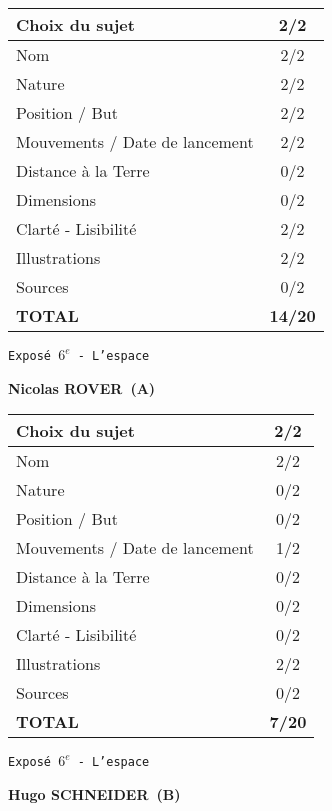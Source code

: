 	\vspace*{2cm}
	\begin{tabular}{|l|c|}
		\hline
		Choix du sujet & 2/2 \\
		\hline
		Nom & 2/2 \\
		\hline
		Nature & 2/2 \\
		\hline
		Position / But & 2/2 \\
		\hline
		Mouvements / Date de lancement & 2/2 \\
		\hline
		Distance \`a la Terre & 0/2 \\
		\hline
		Dimensions & 0/2 \\
		\hline
		Clart\'e - Lisibilit\'e & 2/2 \\
		\hline
		Illustrations & 2/2 \\
		\hline
		Sources & 0/2 \\
		\hline
		\textbf{TOTAL}  & \textbf{14/20} \\
		\hline
	\end{tabular}
	\newline
	\LARGE{\texttt{Expos\'e $6^e$ - L'espace}}
	\vspace*{1cm}

	\textbf{Nicolas ROVER\ (A)}

	\vspace*{2cm}
	\begin{tabular}{|l|c|}
		\hline
		Choix du sujet & 2/2 \\
		\hline
		Nom & 2/2 \\
		\hline
		Nature & 0/2 \\
		\hline
		Position / But & 0/2 \\
		\hline
		Mouvements / Date de lancement & 1/2 \\
		\hline
		Distance \`a la Terre & 0/2 \\
		\hline
		Dimensions & 0/2 \\
		\hline
		Clart\'e - Lisibilit\'e & 0/2 \\
		\hline
		Illustrations & 2/2 \\
		\hline
		Sources & 0/2 \\
		\hline
		\textbf{TOTAL}  & \textbf{7/20} \\
		\hline
	\end{tabular}
	\newline
	\LARGE{\texttt{Expos\'e $6^e$ - L'espace}}
	\vspace*{1cm}

	\textbf{Hugo SCHNEIDER\ (B)}

